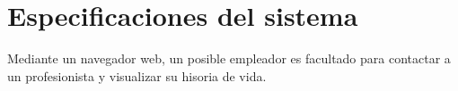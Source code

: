 \section{Especificaciones del sistema}
Mediante un navegador web, un posible empleador es facultado para contactar a un profesionista y visualizar su hisoria de vida.


